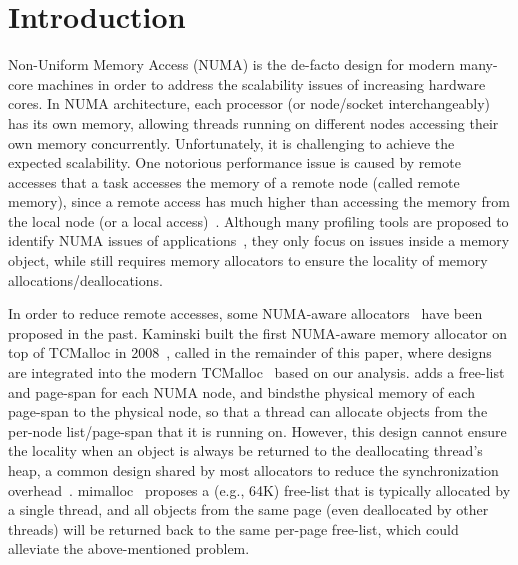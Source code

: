 
\section{Introduction}
\label{sec:intro}


Non-Uniform Memory Access (NUMA) is the de-facto design for modern many-core machines in order to address the scalability issues of increasing hardware cores. In NUMA architecture, each processor (or node/socket interchangeably) has its own memory, allowing threads running on different nodes accessing their own memory concurrently. Unfortunately, it is challenging to achieve the expected scalability. One notorious performance issue is caused by remote accesses that a task accesses the memory of a remote node (called remote memory),  since a remote access has much higher than accessing the memory from the local node (or a local access)~\cite{Blagodurov:2011:CNC:2002181.2002182}. Although many profiling tools are proposed to identify NUMA issues of applications~\cite{Intel:VTune, Memphis, Lachaize:2012:MMP:2342821.2342826, XuNuma, NumaMMA, 7847070, NumaPerf}, they only focus on issues inside a memory object, while still requires memory allocators to ensure the locality of memory allocations/deallocations. 


In order to reduce remote accesses, some NUMA-aware allocators~\cite{tcmallocnuma, kim2013node, yang2019jarena} have been proposed in the past. Kaminski built the first NUMA-aware memory allocator on top of TCMalloc in 2008~\cite{tcmallocnuma}, called \TN{} in the remainder of this paper, where \TN{} designs are integrated into the modern TCMalloc~\cite{tcmalloc2} based on our analysis. \TN{} adds a free-list and page-span for each NUMA node, and bindsthe physical memory of each page-span to the physical node, so that a thread can allocate objects from the per-node list/page-span that it is running on. However, this design cannot ensure the locality when an object is always be returned to the deallocating thread's heap, a common design shared by most allocators to reduce the synchronization overhead~\cite{Hoard}. 
mimalloc~\cite{mimalloc} proposes a  (e.g., 64K) free-list that is typically allocated by a single thread, and all objects from the same page (even deallocated by other threads) will be returned back to the same per-page free-list, which could alleviate the above-mentioned problem.   


